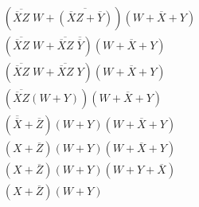 \documentclass[12pt,letterpaper]{article}
\begin{document}
\begin{enumerate}
\begin{align*}
        \left(\overline{\overline{X}Z}\;W + \overline{(\overline{X}Z + \overline{Y})}\right)(W + \overline{X} + Y) \tag{Involution} \\
        \left(\overline{\overline{X}Z}\;W + \overline{\overline{X}Z}\;\overline{\overline{Y}}\right)(W + \overline{X} + Y) \tag{De Morgan's} \\
        \left(\overline{\overline{X}Z}\;W + \overline{\overline{X}Z}\;Y\right)(W + \overline{X} + Y) \tag{Involution} \\
        \left(\overline{\overline{X}Z}(W + Y)\right)(W + \overline{X} + Y) \tag{Distributivity} \\
        (\overline{\overline{X}} + \overline{Z})(W + Y)(W + \overline{X} + Y) \tag{De Morgan's} \\
        (X + \overline{Z})(W + Y)(W + \overline{X} + Y) \tag{Involution} \\
        (X + \overline{Z})(W + Y)(W + Y + \overline{X}) \tag{Commutativity} \\
        (X + \overline{Z})(W + Y) \tag{Covering} \\
      \end{align*}
  \end{enumerate}
\end{document}
